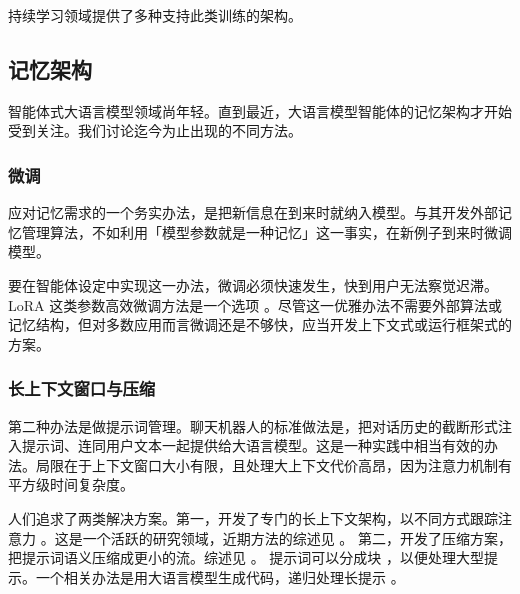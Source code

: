 持续学习领域提供了多种支持此类训练的架构。



\subsection{记忆架构}
智能体式大语言模型领域尚年轻。直到最近，大语言模型智能体的记忆架构才开始受到关注。我们讨论迄今为止出现的不同方法。

\subsubsection{微调}
应对记忆需求的一个务实办法，是把新信息在到来时就纳入模型。与其开发外部记忆管理算法，不如利用「模型参数就是一种记忆」这一事实，在新例子到来时微调模型。

要在智能体设定中实现这一办法，微调必须快速发生，快到用户无法察觉迟滞。LoRA 这类参数高效微调方法是一个选项 \citep{yang2024low}。尽管这一优雅办法不需要外部算法或记忆结构，但对多数应用而言微调还是不够快，应当开发上下文式或运行框架式的方案。

\subsubsection{长上下文窗口与压缩}
第二种办法是做提示词管理。聊天机器人的标准做法是，把对话历史的截断形式注入提示词、连同用户文本一起提供给大语言模型。这是一种实践中相当有效的办法。局限在于上下文窗口大小有限，且处理大上下文代价高昂，因为注意力机制有平方级时间复杂度。

人们追求了两类解决方案。第一，开发了专门的长上下文架构，以不同方式跟踪注意力 \citep{smith2022simplified}。这是一个活跃的研究领域，近期方法的综述见 \citet{liu2025comprehensive}。
第二，开发了压缩方案，把提示词语义压缩成更小的流。综述见 \citet{li2025prompt}。
提示词可以分成块 \citep{sheng2025dynamic}，以便处理大型提示。一个相关办法是用大语言模型生成代码，递归处理长提示 \citep{zhang2025recursive}。

